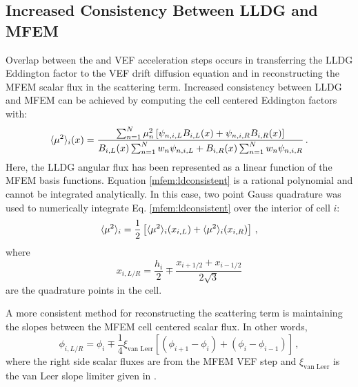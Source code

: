 \subsection{Increased Consistency Between LLDG and MFEM}
Overlap between the \SN and VEF acceleration steps occurs in transferring the LLDG Eddington factor to the VEF drift diffusion equation and in reconstructing the MFEM scalar flux in the \SN scattering term. Increased consistency between LLDG and MFEM can be achieved by computing the cell centered Eddington factors with: 
	\begin{equation} \label{mfem:ldconsistent}
		\langle \mu^2 \rangle_i(x) = \frac{
			\sum_{n=1}^N \mu_n^2 \left[\psi_{n,i,L}B_{i,L}(x) + \psi_{n,i,R} B_{i,R}(x)\right]
		}
		{
			B_{i,L}(x) \sum_{n=1}^N w_n \psi_{n,i,L} + B_{i,R}(x) \sum_{n=1}^N w_n \psi_{n,i,R} 
		} \,. 
	\end{equation}
Here, the LLDG angular flux has been represented as a linear function of the MFEM basis functions. Equation \ref{mfem:ldconsistent} is a rational polynomial and cannot be integrated analytically. In this case, two point Gauss quadrature was used to numerically integrate Eq. \ref{mfem:ldconsistent} over the interior of cell $i$: 
	\begin{equation} 
		\langle \mu^2 \rangle_i = \frac{1}{2} \left[\langle \mu^2 \rangle_i(x_{i,L}) + \langle \mu^2 \rangle_i(x_{i,R})\right] \,, 
	\end{equation}
where 
	\begin{equation} 
		x_{i,L/R} = \frac{h_i}{2} \mp \frac{x_{i+1/2} + x_{i-1/2}}{2\sqrt{3}}
	\end{equation}
are the quadrature points in the cell. 

A more consistent method for reconstructing the \SN scattering term is maintaining the slopes between the MFEM cell centered scalar flux. In other words, 
	\begin{equation} 
		\phi_{i,L/R} = \phi_i \mp \frac{1}{4} \xi_\text{van Leer} \left[\left(\phi_{i+1} - \phi_i\right) + \left(\phi_i - \phi_{i-1}\right) \right] \,,
	\end{equation}
where the right side scalar fluxes are from the MFEM VEF step and $\xi_\text{van Leer}$ is the van Leer slope limiter given in \cite{vanLeer}. 